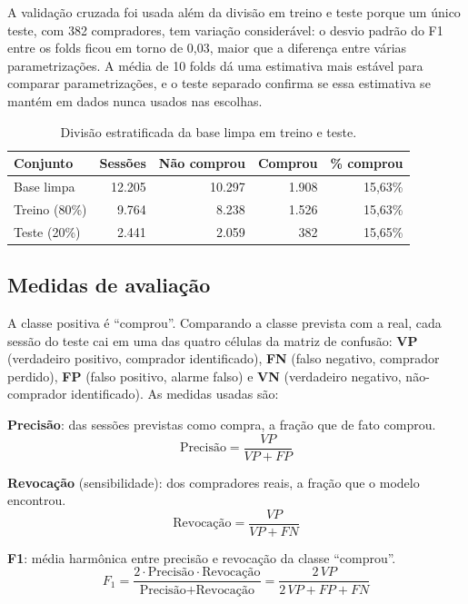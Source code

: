 \documentclass[11pt,a4paper]{article}
\begin{document}
A validação cruzada foi usada além da divisão em treino e teste porque um único teste, com 382 compradores, tem
variação considerável: o desvio padrão do F1 entre os folds ficou em torno de 0,03, maior que a diferença entre várias
parametrizações. A média de 10 folds dá uma estimativa mais estável para comparar parametrizações, e o teste separado
confirma se essa estimativa se mantém em dados nunca usados nas escolhas.

\begin{table}[H]
  \centering\small
  \caption{Divisão estratificada da base limpa em treino e teste.}
  \label{tab:divisao}
  \begin{tabular}{lrrrr}
    \toprule
    Conjunto & Sessões & Não comprou & Comprou & \% comprou\\
    \midrule
    Base limpa & 12.205 & 10.297 & 1.908 & 15,63\%\\
    Treino (80\%) & 9.764 & 8.238 & 1.526 & 15,63\%\\
    Teste (20\%) & 2.441 & 2.059 & 382 & 15,65\%\\
    \bottomrule
  \end{tabular}
\end{table}

\subsection{Medidas de avaliação}

A classe positiva é ``comprou''. Comparando a classe prevista com a real, cada sessão do teste cai em uma das quatro
células da matriz de confusão: \textbf{VP} (verdadeiro positivo, comprador identificado), \textbf{FN} (falso negativo,
comprador perdido), \textbf{FP} (falso positivo, alarme falso) e \textbf{VN} (verdadeiro negativo, não-comprador
identificado). As medidas usadas são:

\textbf{Precisão}: das sessões previstas como compra, a fração que de fato comprou.
\begin{equation*}
  \text{Precisão} = \frac{VP}{VP + FP}
\end{equation*}

\textbf{Revocação} (sensibilidade): dos compradores reais, a fração que o modelo encontrou.
\begin{equation*}
  \text{Revocação} = \frac{VP}{VP + FN}
\end{equation*}

\textbf{F1}: média harmônica entre precisão e revocação da classe ``comprou''.
\begin{equation*}
  F_1 = \frac{2 \cdot \text{Precisão} \cdot \text{Revocação}}{\text{Precisão} + \text{Revocação}}
      = \frac{2\,VP}{2\,VP + FP + FN}
\end{equation*}
\end{document}
